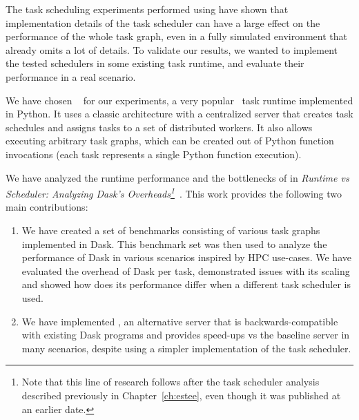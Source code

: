 
The task scheduling experiments performed using \estee{} have shown that
implementation details of the task scheduler can have a large effect on the performance of the
whole task graph, even in a fully simulated environment that already omits a lot of details. To
validate our results, we wanted to implement the tested schedulers in some existing task runtime,
and evaluate their performance in a real scenario.

We have chosen \dask{}~\cite{dask} for our experiments, a very
popular~\cite{dask-user-survey} task runtime implemented in Python. It uses a classic architecture
with a centralized server that creates task schedules and assigns tasks to a set of distributed
workers. It also allows executing arbitrary task graphs, which can be created out of Python
function invocations (each task represents a single Python function execution).

We have analyzed the runtime performance and the bottlenecks of \dask{} in
\emph{Runtime vs Scheduler: Analyzing Dask's Overheads\footnote{Note that this line of research follows after the task scheduler analysis described previously in
Chapter~\ref{ch:estee}, even though it was published at an earlier date.}}~\cite{rsds}. This work provides the following two main
contributions:
\begin{enumerate}
	\item We have created a set of benchmarks consisting of various task graphs implemented in Dask. This
	      benchmark set was then used to analyze the performance of Dask in various scenarios inspired by HPC
	      use-cases. We have evaluated the overhead of Dask per task, demonstrated issues with its scaling
	      and showed how does its performance differ when a different task scheduler is used.
	\item We have implemented \rsds{}, an alternative \dask{} server that is
	      backwards-compatible with existing Dask programs and provides speed-ups vs the baseline
	      \dask{} server in many scenarios, despite using a simpler implementation of the task
	      scheduler.
\end{enumerate}


